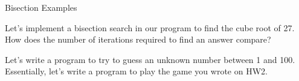 \documentclass[pdf, aspectratio=169, 12pt]{beamer}
\begin{document}
\begin{frame}{Bisection Examples}
	\begin{example}
		Let's implement a bisection search in our program to find the cube root of 27. How does the number of iterations required to find an answer compare?
	\end{example}

	\pause
	\begin{example}
		Let's write a program to try to guess an unknown number between 1 and 100. Essentially, let's write a program to play the game you wrote on HW2.
	\end{example}
\end{frame}
\end{document}
